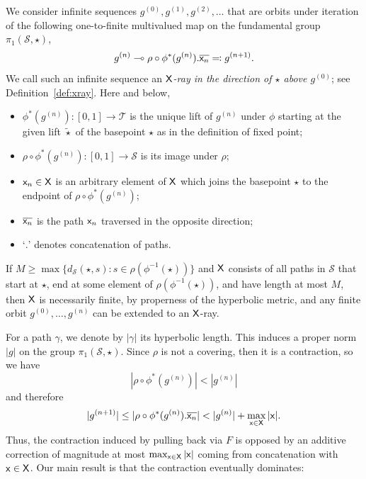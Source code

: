 \documentclass{amsart}
\theoremstyle{definition}
\theoremstyle{remark}
\newcommand{\sfX}{{\sf X}}
\newcommand{\sfx}{{\sf x}}
\newcommand{\cT}{\mathcal{T}}
\newcommand{\cS}{\mathcal{S}}
\begin{document}
We consider infinite sequences $g^{(0)}, g^{(1)}, g^{(2)}, \ldots$ that are orbits under iteration of the following one-to-finite multivalued map on the fundamental group $\pi_1(\cS, \star)$,
\begin{equation}\label{eq:X_ray}
g^{(n)} \multimap \rho\circ \phi^*(g^{(n)}).\overline{\sfx_n} \eqqcolon g^{(n+1)}.
\end{equation}
We call such an infinite sequence an \emph{$\sfX$-ray in the direction of $\star$ above $g^{(0)}$}; see Definition~\ref{def:xray}. Here and below, %
\begin{itemize}
\item $\phi^* (g^{(n)})\colon[0,1]\to\cT$ is the unique lift of $g^{(n)}$ under $\phi$ starting at the given lift $\tilde{\star}$ of the basepoint $\star$ as in the definition of fixed point; 
\item $\rho\circ \phi^*(g^{(n)})\colon[0,1]\to\cS$ is its image under $\rho$;
\item $\sfx_n\in \sfX$ is an arbitrary element of $\sfX$ which joins the basepoint $\star$ to the endpoint of $\rho\circ \phi^* (g^{(n)})$;
\item $\overline{\sfx_n}$ is the path $\sfx_n$ traversed in the opposite direction;
\item `$.$' denotes concatenation of paths.
\end{itemize}

If $M\geq \max\{d_\cS(\star, s) : s \in \rho(\phi^{-1}(\star))\}$ and $\sfX$ consists of all paths in $\cS$ that start at $\star$, end at some element of $\rho(\phi^{-1}(\star))$, and have length at most $M$, then $\sfX$ is necessarily finite, by properness of the hyperbolic metric, and any finite orbit $g^{(0)},\dots,g^{(n)}$ can be extended to an $\sfX$-ray.

For a path $\gamma$, we denote by $|\gamma|$ its hyperbolic length. This induces a proper norm $|g|$ on the group $\pi_1(\cS, \star)$.  Since $\rho$ is not a covering, then it is a contraction, so we have 
\[ |\rho\circ \phi^*(g^{(n)})|<|g^{(n)}|\]
and therefore
\begin{equation}\label{eq:contract}
  |g^{(n+1)}| \leq |\rho\circ \phi^*(g^{(n)}).\overline{\sfx_n}|<|g^{(n)}|+\max_{\sfx\in\sfX}|\sfx|.
\end{equation}
Thus, the  contraction induced by pulling back via $F$ is opposed by an additive correction of magnitude at most $\max_{\sfx\in\sfX}|\sfx|$ coming from concatenation with $\sfx\in \sfX$. Our main result is that the contraction eventually dominates:
\end{document}
